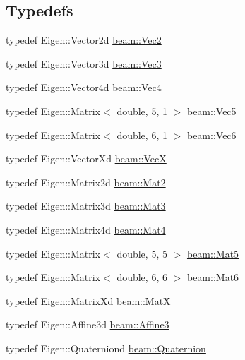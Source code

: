 \subsection*{Typedefs}
\begin{DoxyCompactItemize}
\item 
typedef Eigen\+::\+Vector2d \hyperlink{group__utils_ga6112bda54e53755ab14060144285c6b0}{beam\+::\+Vec2}
\item 
typedef Eigen\+::\+Vector3d \hyperlink{group__utils_ga7aca82b90a74cb643417801e830cd43f}{beam\+::\+Vec3}
\item 
typedef Eigen\+::\+Vector4d \hyperlink{group__utils_gae8c630e8f7e9cdbc1a7dcc3073a99d5c}{beam\+::\+Vec4}
\item 
typedef Eigen\+::\+Matrix$<$ double, 5, 1 $>$ \hyperlink{group__utils_gabd17e53e0e9320ff4dcbad3b0e591928}{beam\+::\+Vec5}
\item 
typedef Eigen\+::\+Matrix$<$ double, 6, 1 $>$ \hyperlink{group__utils_ga9f18e27181a175dfd15dc192a7d417d1}{beam\+::\+Vec6}
\item 
typedef Eigen\+::\+Vector\+Xd \hyperlink{group__utils_gae5ba967e4b0d4b421ca30ef46f896145}{beam\+::\+VecX}
\item 
typedef Eigen\+::\+Matrix2d \hyperlink{group__utils_gaa647b85b058c8a50386a3da8dd719e3d}{beam\+::\+Mat2}
\item 
typedef Eigen\+::\+Matrix3d \hyperlink{group__utils_ga665fed2673de952d12b19351a2bdb961}{beam\+::\+Mat3}
\item 
typedef Eigen\+::\+Matrix4d \hyperlink{group__utils_ga06979ede648a91a7e5465980784ebb1b}{beam\+::\+Mat4}
\item 
typedef Eigen\+::\+Matrix$<$ double, 5, 5 $>$ \hyperlink{group__utils_ga34f1d113f166129c5b89fe92c5a07e02}{beam\+::\+Mat5}
\item 
typedef Eigen\+::\+Matrix$<$ double, 6, 6 $>$ \hyperlink{group__utils_gac42e2f9ad085d2fcc34875015c43cecc}{beam\+::\+Mat6}
\item 
typedef Eigen\+::\+Matrix\+Xd \hyperlink{group__utils_gaf1ee9917aef6e6cf513d29f8c7d2eeee}{beam\+::\+MatX}
\item 
typedef Eigen\+::\+Affine3d \hyperlink{group__utils_ga609e7e934806a61b3cb511b893f799ce}{beam\+::\+Affine3}
\item 
typedef Eigen\+::\+Quaterniond \hyperlink{group__utils_gab34e0dc5bdfa343eebf793fdc084a07f}{beam\+::\+Quaternion}
\end{DoxyCompactItemize}
